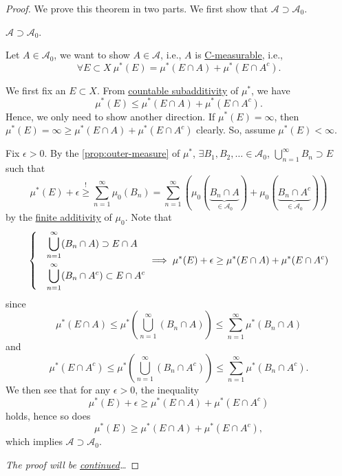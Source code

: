 \begin{proof}\let\qed\relax
	We prove this theorem in two parts. We first show that \(\mathcal{A} \supset \mathcal{A} _0\).
	\begin{claim}
		\(\mathcal{A} \supset \mathcal{A} _0\).
	\end{claim}
	\begin{explanation}
		Let \(A\in \mathcal{A} _0\), we want to show \(A\in \mathcal{A} \), i.e.,
		\(A\) is \hyperref[def:C-measurable]{C-measurable}, i.e.,
		\[
			\forall E\subset X\ \mu^{\ast} (E) = \mu^{\ast} (E\cap A) + \mu^{\ast} (E\cap A^{c}).
		\]

		\par We first fix an \(E\subset X\). From \hyperref[def:outer-measure-countable-subadditivity]{countable subadditivity} of \(\mu^{\ast} \), we have
		\[
			\mu^{\ast} (E) \leq \mu^{\ast} (E\cap A) + \mu^{\ast} (E\cap A^{c} ).
		\]
		Hence, we only need to show another direction. If \(\mu^{\ast} (E) = \infty \), then \(\mu^{\ast} (E) = \infty \geq \mu^{\ast} (E\cap A) + \mu^{\ast} (E\cap A^{c} )\) clearly.
		So, assume \(\mu^{\ast} (E)<\infty \).

		\par Fix \(\epsilon >0\). By the \autoref{prop:outer-measure} of \(\mu^{\ast} \), \(\exists B_1, B_2, \dots \in \mathcal{A}_0\),
		\(\bigcup_{n=1}^{\infty} B_{n}\supset E\) such that
		\[
			\mu^{\ast} (E) + \epsilon \overset{\hyperref[prop:outer-measure]{!}}{\geq} \sum_{n=1}^{\infty} \mu_0(B_{n}) = \sum_{n=1}^{\infty} \left(\mu_0(\underbrace{B_{n}\cap A}_{\in \mathcal{A} _0}) + \mu_0(\underbrace{B_{n}\cap A^{c}}_{\in \mathcal{A} _0} )\right)
		\]
		by the \hyperref[def:pre-measure-finite-additivity]{finite additivity} of \(\mu_0\). Note that
		\[
			\begin{dcases}
				 & \bigcup_{n=1}^{\infty} (B_{n}\cap A)      \supset E\cap A     \\
				 & \bigcup_{n=1}^{\infty} (B_{n}\cap A^{c})  \subset E\cap A^{c}
			\end{dcases}\implies \mu^{\ast} (E)+\epsilon \geq \mu^{\ast} (E\cap A) + \mu^{\ast} (E\cap A^{c} )
		\]
		since
		\[
			\mu^{\ast} (E\cap A)\leq \mu^{\ast} \left(\bigcup_{n=1}^{\infty} (B_{n}\cap A)\right)\leq \sum_{n=1}^{\infty} \mu^{\ast} (B_{n}\cap A)
		\]
		and
		\[
			\mu^{\ast} (E\cap A^{c} )\leq \mu^{\ast} \left(\bigcup_{n=1}^{\infty} (B_{n}\cap A^{c})\right) \leq \sum_{n=1}^{\infty} \mu^{\ast} (B_{n}\cap A^{c} ).
		\]
		We then see that for any \(\epsilon >0\), the inequality
		\[
			\mu^{\ast} (E)+\epsilon \geq \mu^{\ast} (E\cap A) + \mu^{\ast} (E\cap A^{c} )
		\]
		holds, hence so does
		\[
			\mu^{\ast} (E) \geq \mu^{\ast} (E\cap A) + \mu^{\ast} (E\cap A^{c} ),
		\]
		which implies \(\mathcal{A} \supset \mathcal{A} _0\).
	\end{explanation}
	\emph{The proof will be \hyperref[pf:Hahn-Kolmogorov-Thm-cont]{continued}\dots}
\end{proof}